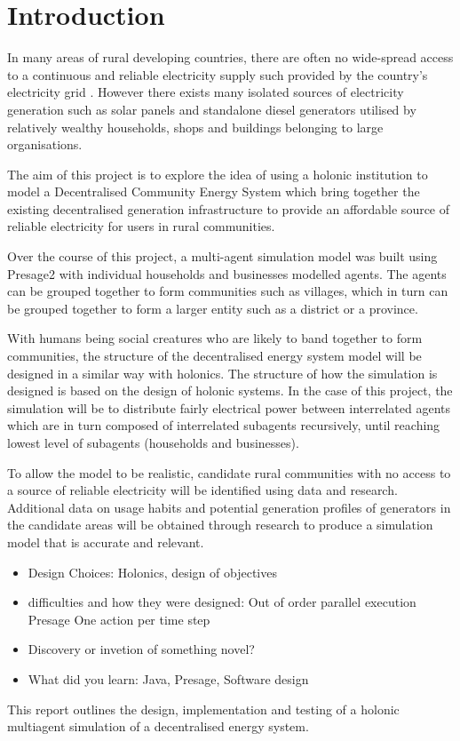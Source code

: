 \chapter{Introduction}
\label{introduction}

In many areas of rural developing countries, there are often no wide-spread access to a continuous and reliable electricity supply such provided by the country's electricity grid \cite{IEA-web:2015}. However there exists many isolated sources of electricity generation such as solar panels and standalone diesel generators utilised by relatively wealthy households, shops and buildings belonging to large organisations. 

The aim of this project is to explore the idea of using a holonic institution to model a Decentralised Community Energy System which bring together the existing decentralised generation infrastructure to provide an affordable source of reliable electricity for users in rural communities. 

Over the course of this project, a multi-agent simulation model was built using Presage2 with individual households and businesses modelled agents. The agents can be grouped together to form communities such as villages, which in turn can be grouped together to form a larger entity such as a district or a province. 

With humans being social creatures who are likely to band together to form communities, the structure of the decentralised energy system model will be designed in a similar way with holonics. The structure of how the simulation is designed is based on the design of holonic systems. In the case of this project, the simulation will be to distribute fairly electrical power between interrelated agents which are in turn composed of interrelated subagents recursively, until reaching lowest level of subagents (households and businesses). 

To allow the model to be realistic, candidate rural communities with no access to a source of reliable electricity will be identified using data and research. Additional data on usage habits and potential generation profiles of generators in the candidate areas will be obtained through research to produce a simulation model that is accurate and relevant.

\begin{itemize}
\item Design Choices: Holonics, design of objectives
\item difficulties and how they were designed:
\subitem Out of order parallel execution
\subitem Presage
\subitem One action per time step
\item Discovery or invetion of something novel?
\item What did you learn:
\subitem Java, Presage, Software design
\end{itemize}


This report outlines the design, implementation and testing of a holonic multiagent simulation of a decentralised energy system. 
